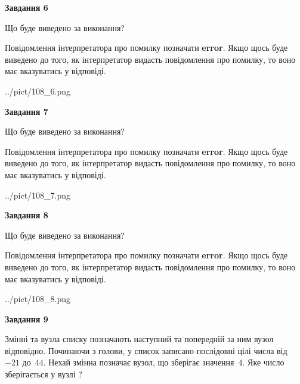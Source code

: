 \documentclass[12pt, ukrainian]{article}
\begin{document}
{\begin {large}
{\begin {center}\textbf{Завдання 6}\end {center}}\par
Що буде виведено за виконання?

Повідомлення інтерпретатора про помилку позначати \textbf{error}.
Якщо щось буде виведено до того, як інтерпретатор видасть повідомлення про помилку, 
то воно має вказуватись у відповіді. \par


\begin{center}
	{../pict/108_6.png}
\end{center}
\newpage

{\begin {center}\textbf{Завдання 7}\end {center}}\par
Що буде виведено за виконання?

Повідомлення інтерпретатора про помилку позначати \textbf{error}.
Якщо щось буде виведено до того, як інтерпретатор видасть повідомлення про помилку, 
то воно має вказуватись у відповіді. \par


\begin{center}
	{../pict/108_7.png}
\end{center}
\newpage

{\begin {center}\textbf{Завдання 8}\end {center}}\par
Що буде виведено за виконання?

Повідомлення інтерпретатора про помилку позначати \textbf{error}.
Якщо щось буде виведено до того, як інтерпретатор видасть повідомлення про помилку, 
то воно має вказуватись у відповіді. \par


\begin{center}
	{../pict/108_8.png}
\end{center}
\newpage

{\begin {center}\textbf{Завдання 9}\end {center}}\par
Змінні  та  вузла списку позначають наступний та попередній за ним вузол відповідно. Починаючи з голови, у список записано послідовні цілі числа від~$-21$ до~$44$. Нехай змінна  позначає вузол, що зберігає значення~$4$.
Яке число зберігається у вузлі  ?\par
\newpage


\end{large}}
\end{document}
